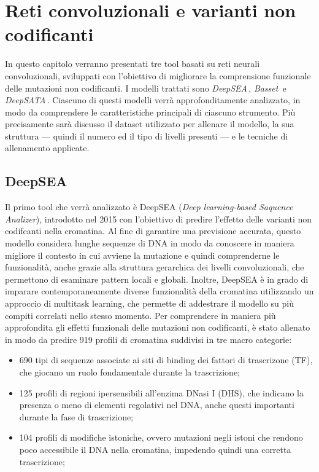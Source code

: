 \chapter{Reti convoluzionali e varianti non codificanti}\label{chp:CNN-non-coding-variants}

In questo capitolo verranno presentati tre tool basati su reti neurali convoluzionali, sviluppati con l'obiettivo di migliorare la comprensione funzionale delle mutazioni non codificanti. I modelli trattati sono \textsl{DeepSEA}\,\cite{zhou2015predicting}, \textsl{Basset}\,\cite{kelley2016basset} e \textsl{DeepSATA}\,\cite{ma2023deepsata}. Ciascuno di questi modelli verrà approfonditamente analizzato, in modo da comprendere le caratteristiche principali di ciascuno strumento. Più precisamente sarà discusso il dataset utilizzato per allenare il modello, la sua struttura — quindi il numero ed il tipo di livelli presenti — e le tecniche di allenamento applicate.

\section{DeepSEA}\label{sec:DeepSEA}
% 
Il primo tool che verrà analizzato è DeepSEA (\textit{Deep learning-based Saquence Analizer}), introdotto nel 2015 con l'obiettivo di predire l'effetto delle varianti non codifcanti nella cromatina. Al fine di garantire una previsione accurata, questo modello considera lunghe sequenze di \acs{DNA} in modo da conoscere in maniera migliore il contesto in cui avviene la mutazione e quindi comprenderne le funzionalità, anche grazie alla struttura gerarchica dei livelli convoluzionali, che permettono di esaminare pattern locali e globali. 
Inoltre, DeepSEA è in grado di imparare contemporaneamente diverse funzionalità della cromatina utilizzando un approccio di multitask learning, che permette di addestrare il modello su più compiti correlati nello stesso momento. Per comprendere in maniera più approfondita gli effetti funzionali delle mutazioni non codificanti, è stato allenato in modo da predire 919 profili di cromatina suddivisi in tre macro categorie:
% 
\begin{itemize}
    \item 690 tipi di sequenze associate ai siti di binding dei fattori di trascrizone (\acs{TF}), che giocano un ruolo fondamentale durante la trascrizione;
    \item 125 profili di regioni ipersensibili all'enzima DNasi I (\acs{DHS}), che indicano la presenza o meno di elementi regolativi nel \acs{DNA}, anche questi importanti durante la fase di trascrizione;
    \item 104 profili di modifiche istoniche, ovvero mutazioni negli istoni che rendono poco accessibile il \acs{DNA} nella cromatina, impedendo quindi una corretta trascrizione;
\end{itemize}
% 

